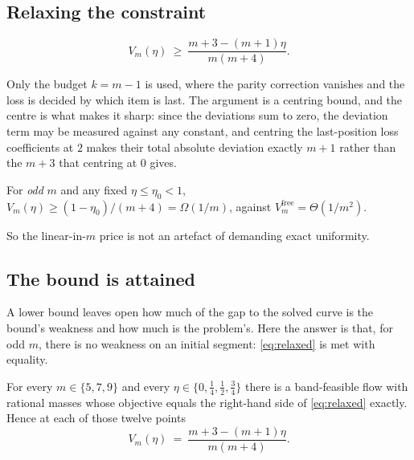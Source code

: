 \subsection{Relaxing the constraint}

\begin{theorem}
\label{thm:relaxed}
\begin{equation}
V_{m}(\eta)\ \ge\ \frac{m+3-(m+1)\eta}{m(m+4)} .
\label{eq:relaxed}
\end{equation}
\end{theorem}


Only the budget $k=m-1$ is used, where the parity correction vanishes and the loss is
decided by which item is last. The argument is a centring bound, and the centre is what
makes it sharp: since the deviations sum to zero, the deviation term may be measured against
any constant, and centring the last-position loss coefficients at $2$ makes their total
absolute deviation exactly $m+1$ rather than the $m+3$ that centring at $0$ gives.


\begin{corollary}
For \emph{odd} $m$ and any fixed $\eta\le\eta_{0}<1$,
$V_{m}(\eta)\ge(1-\eta_{0})/(m+4)=\Omega(1/m)$, against
$V^{\mathrm{free}}_{m}=\Theta(1/m^{2})$.
\end{corollary}


So the linear-in-$m$ price is not an artefact of demanding exact uniformity.

\subsection{The bound is attained}
\label{sec:attained}

A lower bound leaves open how much of the gap to the solved curve is the bound's weakness
and how much is the problem's. Here the answer is that, for odd $m$, there is no weakness on
an initial segment: \eqref{eq:relaxed} is met with equality.

\begin{proposition}
\label{prop:attained}
For every $m\in\{5,7,9\}$ and every $\eta\in\{0,\tfrac14,\tfrac12,\tfrac34\}$ there is a
band-feasible flow with rational masses whose objective equals the right-hand side of
\eqref{eq:relaxed} exactly. Hence at each of those twelve points
\begin{equation}
V_{m}(\eta)\ =\ \frac{m+3-(m+1)\eta}{m(m+4)} .
\label{eq:attained}
\end{equation}
\end{proposition}

